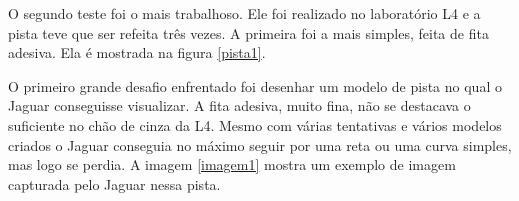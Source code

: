 	\begin{figure}[H]
		\centering
\end{figure}

O segundo teste foi o mais trabalhoso. Ele foi realizado no laboratório L4 e a pista teve que ser refeita três vezes. A primeira foi a mais simples, feita de fita adesiva. Ela é mostrada na figura \ref{pista1}.

	\begin{figure}[H]
		\centering
\end{figure}

O primeiro grande desafio enfrentado foi desenhar um modelo de pista no qual o Jaguar conseguisse visualizar. A fita adesiva, muito fina, não se destacava o suficiente no chão de cinza da L4. Mesmo com várias tentativas e vários modelos criados o Jaguar conseguia no máximo seguir por uma reta ou uma curva simples, mas logo se perdia. A imagem \ref{imagem1} mostra um exemplo de imagem capturada pelo Jaguar nessa pista.

